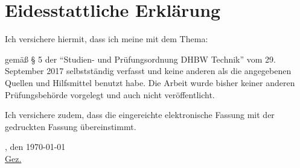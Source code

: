 \chapter*{Eidesstattliche Erklärung}
Ich versichere hiermit, dass ich meine \arbeit{} mit dem Thema:
\begin{quote}
	\textit{\titel}
\end{quote}
gemäß § 5 der \enquote{Studien- und Prüfungsordnung DHBW Technik} vom 29. September 2017 selbstständig verfasst und keine anderen als die angegebenen Quellen und Hilfsmittel benutzt habe. Die Arbeit wurde bisher keiner anderen Prüfungsbehörde vorgelegt und auch nicht veröffentlicht.

\vspace{0.25cm}

Ich versichere zudem, dass die eingereichte elektronische Fassung mit der gedruckten Fassung übereinstimmt.

\vspace{1cm}

\verfassungsort, den \today \\[0.5cm]
{\underline{Gez. \autor}}
{\makebox[6cm]{\hrulefill}}\\